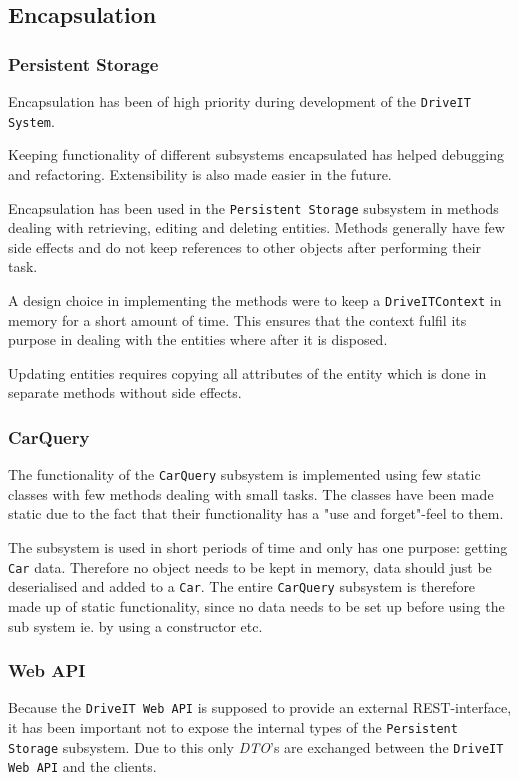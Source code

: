 \subsection{Encapsulation}
\subsubsection{Persistent Storage}
Encapsulation has been of high priority during development of the \texttt{DriveIT System}. 

Keeping functionality of different subsystems encapsulated has helped debugging and refactoring. Extensibility is also made easier in the future.

Encapsulation has been used in the \texttt{Persistent Storage} subsystem in methods dealing with retrieving, editing and deleting entities. Methods generally have few side effects and do not keep references to other objects after performing their task.

A design choice in implementing the methods were to keep a \texttt{DriveITContext} in memory for a short amount of time. This ensures that the context fulfil its purpose in dealing with the entities where after it is disposed.

Updating entities requires copying all attributes of the entity which is done in separate methods without side effects.

\subsubsection{CarQuery}
The functionality of the \texttt{CarQuery} subsystem is implemented using few static classes with few methods dealing with small tasks. The classes have been made static due to the fact that their functionality has a "use and forget"-feel to them. 

The subsystem is used in short periods of time and only has one purpose: getting \texttt{Car} data. Therefore no object needs to be kept in memory, data should just be deserialised and added to a \texttt{Car}. The entire \texttt{CarQuery} subsystem is therefore made up of static functionality, since no data needs to be set up before using the sub system ie. by using a constructor etc. 

\subsubsection{Web API}
Because the \texttt{DriveIT Web API} is supposed to provide an external REST-interface, it has been important not to expose the internal types of the \texttt{Persistent Storage} subsystem. Due to this only \textit{DTO}'s are exchanged between the \texttt{DriveIT Web API} and the clients.\\

